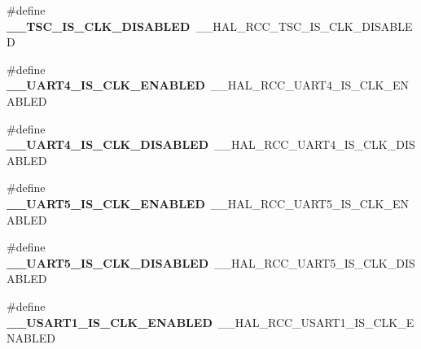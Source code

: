 \begin{DoxyCompactItemize}
\item 
\hypertarget{group___h_a_l___r_c_c___aliased_ga26cfc13289aa205af204bcb46b4e6ed6}{\#define {\bfseries \-\_\-\-\_\-\-T\-S\-C\-\_\-\-I\-S\-\_\-\-C\-L\-K\-\_\-\-D\-I\-S\-A\-B\-L\-E\-D}~\-\_\-\-\_\-\-H\-A\-L\-\_\-\-R\-C\-C\-\_\-\-T\-S\-C\-\_\-\-I\-S\-\_\-\-C\-L\-K\-\_\-\-D\-I\-S\-A\-B\-L\-E\-D}\label{group___h_a_l___r_c_c___aliased_ga26cfc13289aa205af204bcb46b4e6ed6}

\item 
\hypertarget{group___h_a_l___r_c_c___aliased_ga37af363ea4a9ef8343ff19ebc2ac15c3}{\#define {\bfseries \-\_\-\-\_\-\-U\-A\-R\-T4\-\_\-\-I\-S\-\_\-\-C\-L\-K\-\_\-\-E\-N\-A\-B\-L\-E\-D}~\-\_\-\-\_\-\-H\-A\-L\-\_\-\-R\-C\-C\-\_\-\-U\-A\-R\-T4\-\_\-\-I\-S\-\_\-\-C\-L\-K\-\_\-\-E\-N\-A\-B\-L\-E\-D}\label{group___h_a_l___r_c_c___aliased_ga37af363ea4a9ef8343ff19ebc2ac15c3}

\item 
\hypertarget{group___h_a_l___r_c_c___aliased_gaa11f06c9b2c1c950e217e551c9bb24c4}{\#define {\bfseries \-\_\-\-\_\-\-U\-A\-R\-T4\-\_\-\-I\-S\-\_\-\-C\-L\-K\-\_\-\-D\-I\-S\-A\-B\-L\-E\-D}~\-\_\-\-\_\-\-H\-A\-L\-\_\-\-R\-C\-C\-\_\-\-U\-A\-R\-T4\-\_\-\-I\-S\-\_\-\-C\-L\-K\-\_\-\-D\-I\-S\-A\-B\-L\-E\-D}\label{group___h_a_l___r_c_c___aliased_gaa11f06c9b2c1c950e217e551c9bb24c4}

\item 
\hypertarget{group___h_a_l___r_c_c___aliased_gac8a52d100f428d3a279d63c67b944d14}{\#define {\bfseries \-\_\-\-\_\-\-U\-A\-R\-T5\-\_\-\-I\-S\-\_\-\-C\-L\-K\-\_\-\-E\-N\-A\-B\-L\-E\-D}~\-\_\-\-\_\-\-H\-A\-L\-\_\-\-R\-C\-C\-\_\-\-U\-A\-R\-T5\-\_\-\-I\-S\-\_\-\-C\-L\-K\-\_\-\-E\-N\-A\-B\-L\-E\-D}\label{group___h_a_l___r_c_c___aliased_gac8a52d100f428d3a279d63c67b944d14}

\item 
\hypertarget{group___h_a_l___r_c_c___aliased_ga9c9ebd9d85dd7aae9fc3ed7bf013ce57}{\#define {\bfseries \-\_\-\-\_\-\-U\-A\-R\-T5\-\_\-\-I\-S\-\_\-\-C\-L\-K\-\_\-\-D\-I\-S\-A\-B\-L\-E\-D}~\-\_\-\-\_\-\-H\-A\-L\-\_\-\-R\-C\-C\-\_\-\-U\-A\-R\-T5\-\_\-\-I\-S\-\_\-\-C\-L\-K\-\_\-\-D\-I\-S\-A\-B\-L\-E\-D}\label{group___h_a_l___r_c_c___aliased_ga9c9ebd9d85dd7aae9fc3ed7bf013ce57}

\item 
\hypertarget{group___h_a_l___r_c_c___aliased_ga68f879347beda3f37030ad4ffaf87f8a}{\#define {\bfseries \-\_\-\-\_\-\-U\-S\-A\-R\-T1\-\_\-\-I\-S\-\_\-\-C\-L\-K\-\_\-\-E\-N\-A\-B\-L\-E\-D}~\-\_\-\-\_\-\-H\-A\-L\-\_\-\-R\-C\-C\-\_\-\-U\-S\-A\-R\-T1\-\_\-\-I\-S\-\_\-\-C\-L\-K\-\_\-\-E\-N\-A\-B\-L\-E\-D}\label{group___h_a_l___r_c_c___aliased_ga68f879347beda3f37030ad4ffaf87f8a}


\end{DoxyCompactItemize}
